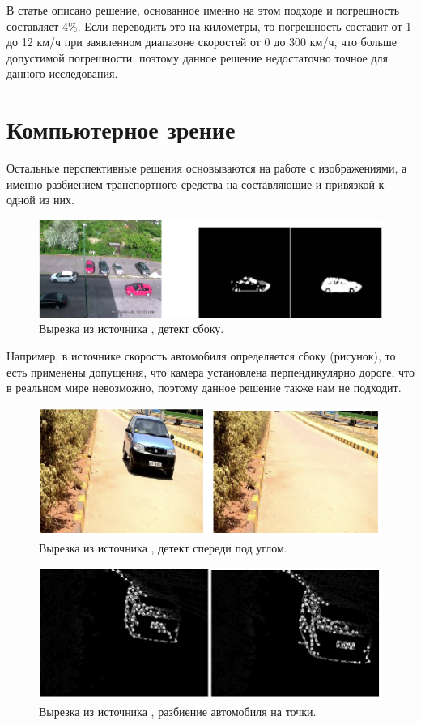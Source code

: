 \documentclass[specification,annotation,times]{itmo-student-thesis}
\begin{document}
	В статье \cite{5228496}  описано решение, основанное именно на этом подходе и погрешность составляет 4\%. Если переводить это на километры, то погрешность составит от 1 до 12 км/ч при заявленном диапазоне скоростей от 0 до 300 км/ч, что больше допустимой погрешности, поэтому данное решение недостаточно точное для данного исследования.
	
	\section{Компьютерное зрение}
	Остальные перспективные решения \cite{Gawande20} основываются на работе с изображениями, а именно разбиением транспортного средства на составляющие и привязкой к одной из них. 
	
	\begin{figure}[!ht]
		\caption{Вырезка из источника \cite{8124468}, детект сбоку.}\label{img:side_car}
		\includegraphics[width=0.85\linewidth]{../png/side_car.png}
		\centering
	\end{figure} 
	
	Например, в источнике \cite{8124468} скорость автомобиля определяется сбоку (рисунок), то есть применены допущения, что камера установлена перпендикулярно дороге, что в реальном мире невозможно, поэтому данное решение также нам не подходит.
	
	\begin{figure}[!ht]
		\caption{Вырезка из источника \cite{6754885}, детект спереди под углом.}\label{img:corner1}
		\includegraphics[width=0.85\linewidth]{../png/corner1.png}
		\centering
	\end{figure} 
	
	\begin{figure}[!ht]
		\caption{Вырезка из источника \cite{6754885}, разбиение автомобиля на точки.}\label{img:corner2}
		\includegraphics[width=0.85\linewidth]{../png/corner2.png}
		\centering
	\end{figure} 
	
\end{document}
